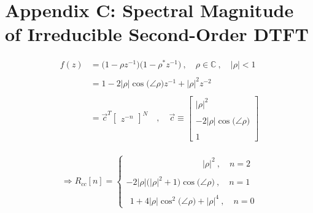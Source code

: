 \documentclass{article}
\begin{document}
\newpage
\section*{Appendix C: Spectral Magnitude of Irreducible Second-Order DTFT}

\begin{align*}
    f(z)&= \big(1 - \rho z^{-1}\big)\big(1 - \rho^{*}z^{-1}\big) \ , \quad \rho \in \mathbb{C} \ , \quad \big|\rho\big| < 1 \\ \\
        &= 1 - 2\big|\rho\big|\cos\big(\angle{\rho}\big)z^{-1} + \big|\rho\big|^{2}z^{-2} \\ \\
        &=\vec{c}^{T}\begin{bmatrix} z^{-n} \end{bmatrix}^{N} \quad, \quad \vec{c} \equiv \begin{bmatrix}
                                                                                                                        \big|\rho\big|^{2} \\ \\
                                                                                                -2\big|\rho\big|\cos\big(\angle{\rho}\big) \\ \\
                                                                                                                                         1
                                                                                            \end{bmatrix} \\
  \end{align*}

\begin{equation*}
    \Rightarrow R_{cc}[n] = \begin{cases}
                                \ \ \quad \quad \quad \quad \quad \quad \quad \quad \ \ \big|\rho\big|^{2} \ , \quad n = 2 \\ \\
                                -2\big|\rho\big|\bigg(\big|\rho\big|^{2} + 1\bigg)\cos\big(\angle{\rho}\big) \ , \quad n = 1 \\ \\
                                \ \ 1 + 4\big|\rho\big|\cos^{2}\big(\angle{\rho}\big) + \big|\rho\big|^{4} \ , \quad n = 0
                              \end{cases}
  \end{equation*}
\end{document}
